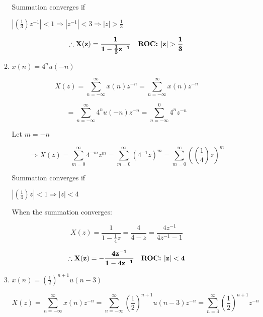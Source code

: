 \documentclass[fleqn]{article}
\begin{document}
\begin{enumerate}[nolistsep]
\begin{enumerate}[nolistsep]
					Summation converges if
					
					$\left|\left(\frac{1}{3}\right)z^{-1}\right| < 1 \Rightarrow |z^{-1}| < 3 \Rightarrow |z| > \frac{1}{3}$
					
					\begin{equation*}
						\mathbf{\therefore X(z) = \frac{1}{1 - \frac{1}{3}z^{-1}} \quad \text{\textbf{ROC: }} |z| > \frac{1}{3}}
					\end{equation*}
					
				\item $x(n) = 4^{n}u(-n)$
				
					\begin{equation*}
						X(z) = \sum_{n=-\infty}^{\infty}x(n)z^{-n} = \sum_{n=-\infty}^{\infty}x(n)z^{-n}
					\end{equation*}
					
					\begin{equation*}
						 = \sum_{n=-\infty}^{\infty}4^{n}u(-n)z^{-n} = \sum_{n=-\infty}^{0}4^{n}z^{-n}
					\end{equation*}
					
					Let $m = -n$
					
					\begin{equation*}
						\Rightarrow X(z) = \sum_{m=0}^{\infty}4^{-m}z^{m} = \sum_{m=0}^{\infty}(4^{-1}z)^{m} = \sum_{m=0}^{\infty}\left(\left(\frac{1}{4}\right)z\right)^{m}
					\end{equation*}
					
					\pagebreak
					Summation converges if
					
					$\left|\left(\frac{1}{4}\right)z\right| < 1 \Rightarrow |z| < 4$
					
					When the summation converges:
					
					\begin{equation*}
						X(z) = \frac{1}{1 - \frac{1}{4}z} = \frac{4}{4 - z} = \frac{4z^{-1}}{4z^{-1} - 1}
					\end{equation*}
					
					\begin{equation*}
						\mathbf{\therefore X(z) = -\frac{4z^{-1}}{1 - 4z^{-1}} \quad \text{\textbf{ROC: }} |z| < 4}
					\end{equation*}
				\item $x(n) = \left(\frac{1}{2}\right)^{n+1}u(n-3)$
				
					\begin{equation*}
						X(z) = \sum_{n=-\infty}^{\infty}x(n)z^{-n} = \sum_{n=-\infty}^{\infty}\left(\frac{1}{2}\right)^{n+1}u(n-3)z^{-n} =  \sum_{n=3}^{\infty}\left(\frac{1}{2}\right)^{n+1}z^{-n}
					\end{equation*}
					

\end{enumerate}
\end{enumerate}
\end{document}
